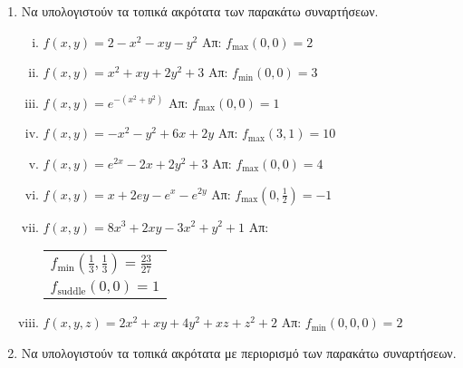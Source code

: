 \documentclass[a4paper,table]{report}
\begin{document}
\begin{center}
  \minibox{\large\bfseries \textcolor{Col1}{Ασκήσεις στα Ακρότατα και Ακρότατα με
  Περιορισμό}}
\end{center}

\vspace{\baselineskip}

\begin{enumerate}
  \item Να υπολογιστούν τα τοπικά ακρότατα των παρακάτω συναρτήσεων.
    \begin{enumerate}[i)]

      \item $ f(x,y) = 2 - x^{2} - xy - y^{2} $ \hfill Απ: 
        $ f_{\text{max}}(0,0) = 2 $

      \item $ f(x,y) = x^{2} + xy + 2y^{2} + 3 $ \hfill Απ: 
        $ f_{\text{min}}(0,0) = 3 $

      \item $ f(x,y) = e^{-(x^{2} + y^{2})} $ \hfill Απ: 
        $ f_{\text{max}}(0,0) = 1  $

      \item $ f(x,y) = -x^{2} - y^{2} + 6x + 2y $ \hfill Απ: 
        $ f_{\text{max}}(3,1) = 10 $ 

      \item $ f(x,y) = e^{2x} - 2x + 2y^{2} + 3 $ \hfill Απ: 
        $ f_{\text{max}}(0,0) =4  $ 

      \item $ f(x,y) = x + 2ey - e^{x} - e^{2y} $ \hfill Απ: 
        $ f_{\text{max}}\left(0, \frac{1}{2}\right) = -1 $

      \item $ f(x,y) = 8x^{3} + 2xy - 3x^{2} + y^{2} + 1 $ \hfill Απ: 
        \begin{tabular}{l}
          $ f_{\text{min}}\left(\frac{1}{3}, \frac{1}{3}\right) = 
          \frac{23}{27} $ \\ 
          $ f_{\text{suddle}}(0,0) = 1 $
        \end{tabular}

      \item $ f(x,y,z) = 2x^{2} + xy + 4y^{2} + xz + z^{2} + 2  $ \hfill Απ: 
        $ f_{\text{min}}(0,0,0) = 2 $

    \end{enumerate}

  \item Να υπολογιστούν τα τοπικά ακρότατα με περιορισμό των παρακάτω συναρτήσεων.


\end{enumerate}
\end{document}
